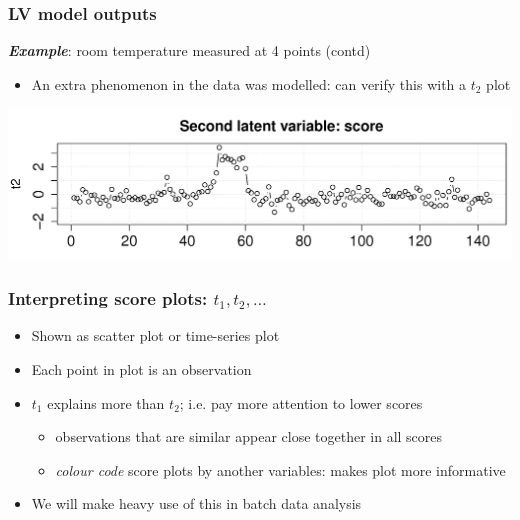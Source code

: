 \begin{frame}\frametitle{LV model outputs}

	\textbf{\emph{Example}}: room temperature measured at 4 points (contd)
	
	\begin{itemize}
		\item	An extra phenomenon in the data was modelled: can verify this with a \( t_2 \) plot
	\end{itemize}

	\begin{center}
		\includegraphics[width=\textwidth]{images/temperatures-LV-2-scores.png}
	\end{center}
\end{frame}

\begin{frame}\frametitle{Interpreting score plots: \(t_1, t_2, \ldots \)}

\begin{itemize}
	\item	Shown as scatter plot or time-series plot

	\item	Each point in plot is an observation

	\item	\(t_1\) explains more than \(t_2\); i.e. pay more attention to lower scores

		\begin{itemize}
			\item	observations that are similar appear close together in all scores
			\item	\emph{colour code} score plots by another variables: makes plot more informative
		\end{itemize}
		
	
	\item	We will make heavy use of this in batch data analysis

\end{itemize}
\end{frame}

